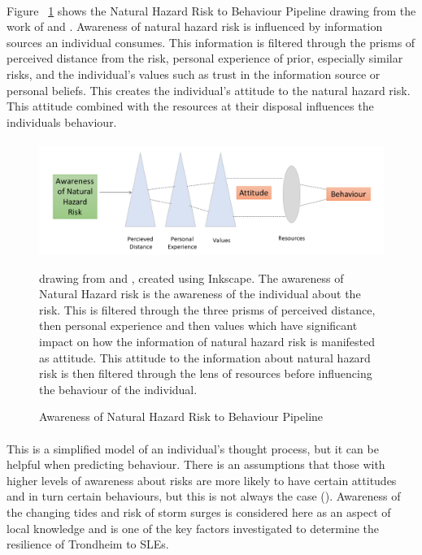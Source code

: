 \paragraph{}
Figure ~\ref{fig:hazard_to_behaviour} shows the Natural Hazard Risk to Behaviour Pipeline drawing from the work of \cite{whitmarsh_are_2008} and \cite{lujala_climate_2015}. Awareness of natural hazard risk is influenced by information sources an individual consumes. This information is filtered through the prisms of perceived distance from the risk, personal experience of prior, especially similar risks, and the individual's values such as trust in the information source or personal beliefs. This creates the individual's attitude to the natural hazard risk. This attitude combined with the resources at their disposal influences the individuals behaviour.

\paragraph{}


\begin{figure}[h]
    \centering
    \includegraphics[width=1\textwidth]{fig_theory/new_awareness_ lujala_whitmarsh.png}
     \caption{Awareness of Natural Hazard Risk to Behaviour Pipeline}{ drawing from \cite{lujala_climate_2015} and \cite{whitmarsh_are_2008}, created using Inkscape.  The awareness of Natural Hazard risk is the awareness of the individual about the risk. This is filtered through the three prisms of perceived distance, then personal experience and then values which have significant impact on how the information of natural hazard risk is manifested as attitude.  
    This attitude to the information about natural hazard risk is then filtered through the lens of resources before influencing the behaviour of the individual.} 
    \label{fig:hazard_to_behaviour}
\end{figure} 
\paragraph{}
This is a simplified model of an individual's thought process, but it can be helpful when predicting behaviour. There is an assumptions that those with higher levels of awareness about risks are more likely to have certain attitudes and in turn certain behaviours, but this is not always the case (\cite{lujala_climate_2015}).  Awareness of the changing tides and risk of storm surges is considered here as an aspect of local knowledge and is one of the key factors investigated to determine the resilience of Trondheim to SLEs. 

